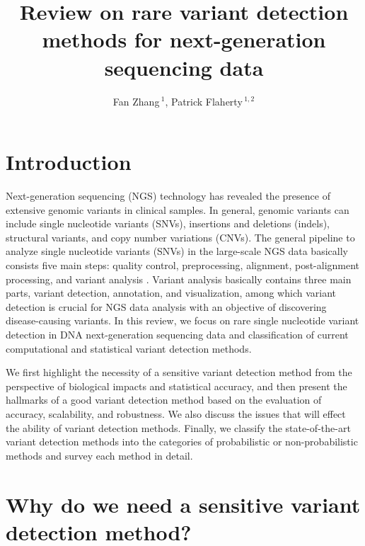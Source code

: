 \documentclass[11pt,reqno]{amsart}
\title[Reveiw on RVD Methods]{Review on rare variant detection methods for next-generation sequencing data}
\author[F. Zhang AND P. Flaherty]{Fan Zhang\,$^{1}$, Patrick Flaherty\,$^{1,2}$}
\begin{document}
\maketitle

\section{Introduction}

Next-generation sequencing (NGS) technology has revealed the presence of extensive genomic variants in clinical samples.
In general, genomic variants can include single nucleotide variants (SNVs), insertions and deletions (indels), structural variants, and copy number variations (CNVs).
The general pipeline to analyze single nucleotide variants (SNVs) in the large-scale NGS data basically consists five main steps: quality control, preprocessing, alignment, post-alignment processing, and variant analysis \citep{Bao2014}.
Variant analysis basically contains three main parts, variant detection, annotation, and visualization, among which variant detection is crucial for NGS data analysis with an objective of discovering disease-causing variants.
In this review, we focus on rare single nucleotide variant detection in DNA next-generation sequencing data and classification of current computational and statistical variant detection methods.

We first highlight the necessity of a sensitive variant detection method from the perspective of biological impacts and statistical accuracy,
and then present the hallmarks of a good variant detection method based on the evaluation of accuracy, scalability, and robustness.
We also discuss the issues that will effect the ability of variant detection methods.
Finally, we classify the state-of-the-art variant detection methods into the categories of probabilistic or non-probabilistic methods and survey each method in detail.


\section{Why do we need a sensitive variant detection method?}
\end{document}
